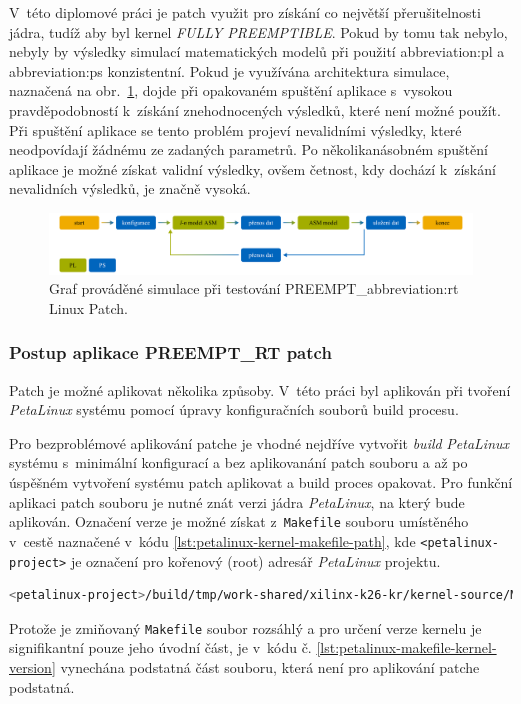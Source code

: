 \documentclass[a4paper, twoside, 11pt]{article}
\newcommand{\fbar}{\FloatBarrier}
\begin{document}
			V~této diplomové práci je patch využit pro získání co největší přerušitelnosti jádra, tudíž aby byl kernel \textit{FULLY PREEMPTIBLE}. Pokud by tomu tak nebylo, nebyly by výsledky simulací matematických modelů při použití \gls{abbreviation:pl} a \gls{abbreviation:ps} konzistentní. Pokud je využívána architektura simulace, naznačená na obr.~\ref{fig:rt-simulation-graph}, dojde při opakovaném spuštění aplikace s~vysokou pravděpodobností k~získání znehodnocených výsledků, které není možné použít. Při spuštění aplikace se tento problém projeví nevalidními výsledky, které neodpovídají žádnému ze zadaných parametrů. Po několikanásobném spuštění aplikace je možné získat validní výsledky, ovšem četnost, kdy dochází k~získání nevalidních výsledků, je značně vysoká.

			\begin{figure}[H]
				\centering
					\includegraphics[width=1\textwidth]{src/pdf/rt-simulation-graph.pdf} 
					\caption{Graf prováděné simulace při testování PREEMPT\_\gls{abbreviation:rt} Linux Patch.}
					\label{fig:rt-simulation-graph}
			\end{figure}
			
			\fbar
			\subsubsection{Postup aplikace PREEMPT\_RT patch}\label{subsubsec:postup-aplikace-preempt-rt-patch}
				Patch je možné aplikovat několika způsoby. V~této práci byl aplikován při tvoření \textit{PetaLinux} systému pomocí úpravy konfiguračních souborů build procesu.\par
				Pro bezproblémové aplikování patche je vhodné nejdříve vytvořit \textit{build} \textit{PetaLinux} systému s~minimální konfigurací a bez aplikovanání patch souboru a až po úspěšném vytvoření systému patch aplikovat a build proces opakovat. Pro funkční aplikaci patch souboru je nutné znát verzi jádra \textit{PetaLinux}, na který bude aplikován. Označení verze je možné získat z~\texttt{Makefile} souboru umístěného v~cestě naznačené v~kódu \ref{lst:petalinux-kernel-makefile-path}, kde \texttt{<petalinux-project>} je označení pro kořenový (root) adresář \textit{PetaLinux} projektu.

				\begin{lstlisting}[language={sh}, caption={Cesta Makefile souboru, ze kterého je možné získat označení verze jádra systému PetaLinux.}, label= {lst:petalinux-kernel-makefile-path}]
<petalinux-project>/build/tmp/work-shared/xilinx-k26-kr/kernel-source/Makefile\end{lstlisting}
				Protože je zmiňovaný \texttt{Makefile} soubor rozsáhlý a pro určení verze kernelu je signifikantní pouze jeho úvodní část, je v~kódu č. \ref{lst:petalinux-makefile-kernel-version} vynechána podstatná část souboru, která není pro aplikování patche podstatná.
\end{document}

